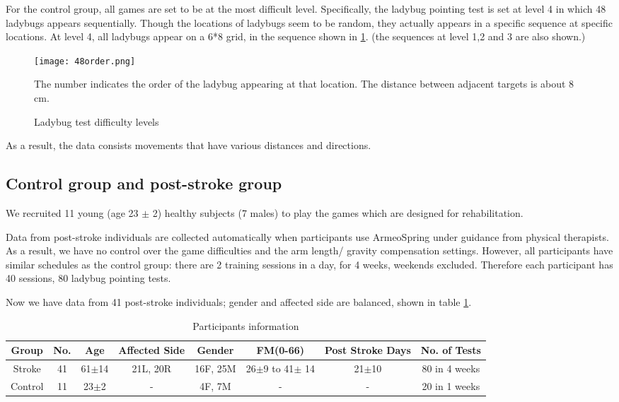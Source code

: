 For the control group, all games are set to be at the most difficult level. Specifically, the ladybug pointing test is set at level 4 in which 48 ladybugs appears sequentially. Though the locations of ladybugs seem to be random, they actually appears in a specific sequence at specific locations. At level 4, all ladybugs appear on a 6*8 grid, in the sequence shown in \ref{fig:48order}. (the sequences at level 1,2 and 3 are also shown.) 

\begin{figure}
	\texttt{[image: 48order.png]}
	\centering
	\caption{Ladybug test difficulty levels}
	\medskip
	\small The number indicates the order of the ladybug appearing at that location. The distance between adjacent targets is about 8 cm.
	\label{fig:48order}
\end{figure}

As a result, the data consists movements that have various distances and directions.

\subsection{Control group and post-stroke group}

We recruited 11 young (age 23 $\pm$ 2) healthy subjects (7 males) to play the games which are designed for rehabilitation.

Data from post-stroke individuals are collected automatically when participants use ArmeoSpring under guidance from physical therapists. As a result, we have no control over the game difficulties and the arm length/ gravity compensation settings. However, all participants have similar schedules as the control group: there are 2 training sessions in a day, for 4 weeks, weekends excluded. Therefore each participant has 40 sessions, 80 ladybug pointing tests.

Now we have data from 41 post-stroke individuals; gender and affected side are balanced, shown in table \ref{tab:demog}. 

\begin{table}[b]
	\begin{tabular}{c c c c c c c c}
	\hline
	Group & No. & Age & Affected Side & Gender & FM(0-66) & Post Stroke Days & No. of Tests\\
	\hline
	Stroke & 41 & 61$\pm$14 & 21L, 20R & 16F, 25M & 26$\pm$9 to 41$\pm$ 14 & 21$\pm$10 & 80 in 4 weeks \\ 
	Control & 11 & 23$\pm$2 & - & 4F, 7M & - & - & 20 in 1 weeks \\
	\hline
	\end{tabular}
	\caption{Participants information}
	\label{tab:demog}
\end{table}

